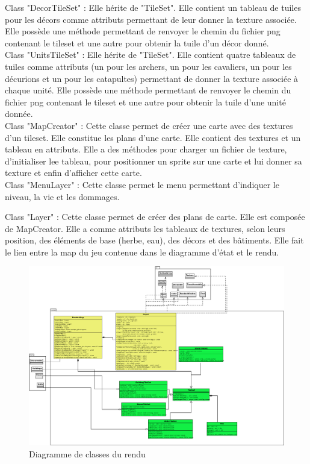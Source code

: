 \documentclass[12pt,a4paper]{article}
\begin{document}
Class "DecorTileSet" :  Elle hérite de "TileSet". Elle contient un tableau de tuiles pour les décors comme attributs permettant de leur donner la texture associée. Elle possède une méthode permettant de renvoyer le chemin du fichier png contenant le tileset et une autre pour obtenir la tuile d'un décor donné. \\

Class "UnitsTileSet" :  Elle hérite de "TileSet". Elle contient quatre tableaux de tuiles comme attributs (un pour les archers, un pour les cavaliers, un pour les décurions et un pour les catapultes) permettant de donner la texture associée à chaque unité. Elle possède une méthode permettant de renvoyer le chemin du fichier png contenant le tileset et une autre pour obtenir la tuile d'une unité donnée. \\

Class "MapCreator" : Cette classe permet de créer une carte avec des textures d'un tileset. Elle constitue les plans d'une carte. Elle contient des textures et un tableau en attributs. Elle a des méthodes pour charger un fichier de texture, d'initialiser lee tableau, pour positionner un sprite sur une carte et lui donner sa texture et enfin d'afficher cette carte.\\

Class "MenuLayer" : Cette classe permet le menu permettant d'indiquer le niveau, la vie et les dommages.

Class "Layer" : Cette classe permet de créer des plans de carte. Elle est composée de MapCreator. Elle a comme attributs les tableaux de textures, selon leurs position, des éléments de base (herbe, eau), des décors et des bâtiments. Elle fait le lien entre la map du jeu contenue dans le diagramme d'état et le rendu.\\



\begin{figure}[!ht]
\centering
    \includegraphics[width=1\textwidth]{ressources/render.png}
     \caption{Diagramme de classes du rendu}
\end{figure}
\end{document}
